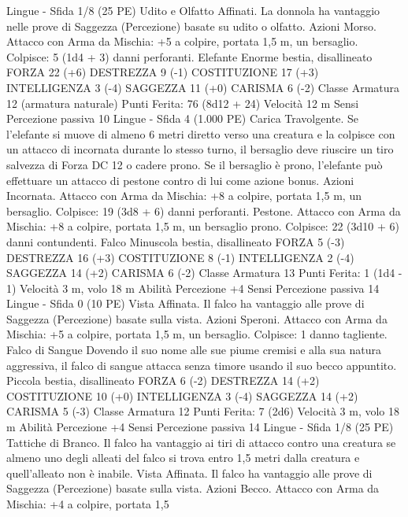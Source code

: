 \begin{multicols}{2}
Lingue -
Sfida 1/8 (25 PE)
Udito e Olfatto Affinati. La donnola ha vantaggio nelle prove di
Saggezza (Percezione) basate su udito o olfatto.
Azioni
Morso. Attacco con Arma da Mischia: +5 a colpire, portata 1,5
m, un bersaglio.
Colpisce: 5 (1d4 + 3) danni perforanti.
Elefante
Enorme bestia, disallineato
FORZA 22 (+6)
DESTREZZA 9 (-1)
COSTITUZIONE 17 (+3)
INTELLIGENZA 3 (-4)
SAGGEZZA 11 (+0)
CARISMA 6 (-2)
Classe Armatura 12 (armatura naturale)
\hspace*{0pt}\hfill{Punti Ferita}: 76 (8d12 + 24)
Velocità 12 m
Sensi Percezione passiva 10
Lingue -
Sfida 4 (1.000 PE)
Carica Travolgente. Se l’elefante si muove di almeno 6 metri
diretto verso una creatura e la colpisce con un attacco di
incornata durante lo stesso turno, il bersaglio deve riuscire un
tiro salvezza di Forza DC 12 o cadere prono. Se il bersaglio è
prono, l’elefante può effettuare un attacco di pestone contro di
lui come azione bonus.
Azioni
Incornata. Attacco con Arma da Mischia: +8 a colpire, portata
1,5 m, un bersaglio.
Colpisce: 19 (3d8 + 6) danni perforanti.
Pestone. Attacco con Arma da Mischia: +8 a colpire, portata 1,5
m, un bersaglio prono.
Colpisce: 22 (3d10 + 6) danni contundenti.
Falco
Minuscola bestia, disallineato
FORZA 5 (-3)
DESTREZZA 16 (+3)
COSTITUZIONE 8 (-1)
INTELLIGENZA 2 (-4)
SAGGEZZA 14 (+2)
CARISMA 6 (-2)
Classe Armatura 13
\hspace*{0pt}\hfill{Punti Ferita}: 1 (1d4 - 1)
Velocità 3 m, volo 18 m
Abilità Percezione +4
Sensi Percezione passiva 14
Lingue -
Sfida 0 (10 PE)
Vista Affinata. Il falco ha vantaggio alle prove di Saggezza
(Percezione) basate sulla vista.
Azioni
Speroni. Attacco con Arma da Mischia: +5 a colpire, portata 1,5
m, un bersaglio.
Colpisce: 1 danno tagliente.
Falco di Sangue
Dovendo il suo nome alle sue piume cremisi e alla sua
natura aggressiva, il falco di sangue attacca senza
timore usando il suo becco appuntito.
Piccola bestia, disallineato
FORZA 6 (-2)
DESTREZZA 14 (+2)
COSTITUZIONE 10 (+0)
INTELLIGENZA 3 (-4)
SAGGEZZA 14 (+2)
CARISMA 5 (-3)
Classe Armatura 12
\hspace*{0pt}\hfill{Punti Ferita}: 7 (2d6)
Velocità 3 m, volo 18 m
Abilità Percezione +4
Sensi Percezione passiva 14
Lingue -
Sfida 1/8 (25 PE)
Tattiche di Branco. Il falco ha vantaggio ai tiri di attacco contro
una creatura se almeno uno degli alleati del falco si trova entro
1,5 metri dalla creatura e quell’alleato non è inabile.
Vista Affinata. Il falco ha vantaggio alle prove di Saggezza
(Percezione) basate sulla vista.
Azioni
Becco. Attacco con Arma da Mischia: +4 a colpire, portata 1,5

\end{multicols}
